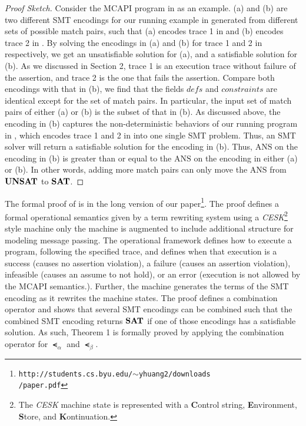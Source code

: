 \begin{proof}[Proof Sketch]
Consider the MCAPI program in  as an example.
(a) and (b) are two different SMT encodings for our running
example in  generated from different sets of possible match pairs, such that (a) encodes trace 1 in  and (b) encodes trace 2 in . By solving the encodings in (a) and (b) for trace 1 and 2 in  respectively, we get an unsatisfiable solution for (a), and a satisfiable solution for (b). As we discussed in Section 2, trace 1 is an execution trace without failure of the assertion, and trace 2 is the one that fails the assertion. %
Compare both encodings with that in (b), we find that
the fields $\mathit{defs}$ and $\mathit{constraints}$ are identical
except for the set of match pairs. In particular, the input set of
match pairs of either (a) or (b) is the subset
of that in (b). As discussed above, the encoding in
(b) captures the non-deterministic behaviors of our
running program in , which encodes trace 1 and 2 in
 into one single SMT problem. Thus, an SMT solver
will return a satisfiable solution for the encoding in
(b). Thus, $\mathrm{ANS}$ on the encoding in
(b) is greater than or equal to the $\mathrm{ANS}$ on
the encoding in either (a) or (b). In other
words, adding more match pairs can only move the $\mathrm{ANS}$ from
$\mathrm{\textbf{UNSAT}}$ to $\mathrm{\textbf{SAT}}$.
\end{proof}

The formal proof of  is in the long version of our paper\footnote{\texttt{http://students.cs.byu.edu/$\sim$yhuang2/downloads\\/paper.pdf}}. The proof defines a formal operational semantics given by a term rewriting system using a \textit{CESK}\footnote{The \textit{CESK} machine state is represented with a \textbf{C}ontrol string, \textbf{E}nvironment, \textbf{S}tore, and \textbf{K}ontinuation.} style machine only the machine is augmented to include additional structure for modeling message passing. The operational framework defines how to execute a program, following the specified trace, and defines when that execution is a success (causes no assertion violation), a failure (causes an assertion violation), infeasible (causes an assume to not hold), or an error (execution is not allowed by the MCAPI semantics.). Further, the machine generates the terms of the SMT encoding as it rewrites the machine states. The proof defines a combination operator and shows that several SMT encodings can be combined such that the combined SMT encoding returns $\mathrm{\textbf{SAT}}$ if one of those encodings has a satisfiable solution.  As such, Theorem 1 is formally proved by applying the combination operator for $\smt_{\alpha}$ and $\smt_{\beta}$.

